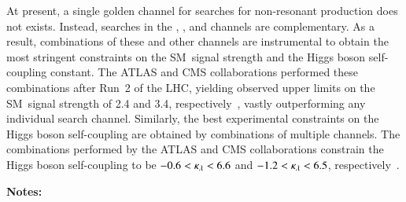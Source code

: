 At present, a single golden channel for searches for non-resonant \HH production
does not exists. Instead, searches in the \bbbb, \bbyy, and \bbtautau channels
are complementary. As a result, combinations of these and other channels are
instrumental to obtain the most stringent constraints on the SM~\HH signal
strength and the Higgs boson self-coupling constant. The ATLAS and CMS
collaborations performed these combinations after Run~2 of the LHC, yielding
observed upper limits on the SM~\HH signal strength of 2.4 and 3.4,
respectively~\cite{HDBS-2022-03,CMS-HIG-22-001}, vastly outperforming any
individual search channel. Similarly, the best experimental constraints on the
Higgs boson self-coupling are obtained by combinations of multiple channels. The
combinations performed by the ATLAS and CMS collaborations constrain the Higgs
boson self-coupling to be $-0.6 < \kappa_{\lambda} < 6.6$ and $-1.2 < \kappa_{\lambda} < 6.5$,
respectively~\cite{HDBS-2022-03,CMS-HIG-22-001}.








\vspace{10em}\noindent\textbf{Notes:}\\










